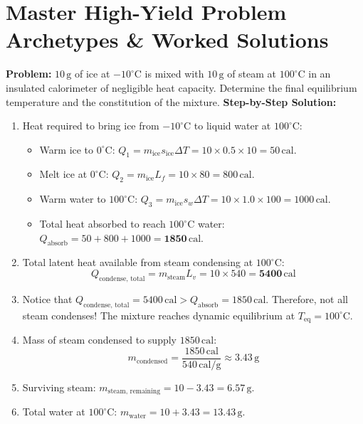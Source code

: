 \documentclass[10pt,a4paper]{article}
\begin{document}
\section{Master High-Yield Problem Archetypes \& Worked Solutions}

\begin{usecasebox}
\textbf{Problem:} $10\,\mathrm{g}$ of ice at $-10^\circ\mathrm{C}$ is mixed with $10\,\mathrm{g}$ of steam at $100^\circ\mathrm{C}$ in an insulated calorimeter of negligible heat capacity. Determine the final equilibrium temperature and the constitution of the mixture.
\textbf{Step-by-Step Solution:}
\begin{enumerate}
  \item Heat required to bring ice from $-10^\circ\mathrm{C}$ to liquid water at $100^\circ\mathrm{C}$:
  \begin{itemize}
    \item Warm ice to $0^\circ\mathrm{C}$: $Q_1 = m_{\text{ice}} s_{\text{ice}} \Delta T = 10 \times 0.5 \times 10 = 50\,\mathrm{cal}$.
    \item Melt ice at $0^\circ\mathrm{C}$: $Q_2 = m_{\text{ice}} L_f = 10 \times 80 = 800\,\mathrm{cal}$.
    \item Warm water to $100^\circ\mathrm{C}$: $Q_3 = m_{\text{ice}} s_w \Delta T = 10 \times 1.0 \times 100 = 1000\,\mathrm{cal}$.
    \item Total heat absorbed to reach $100^\circ\mathrm{C}$ water: $Q_{\text{absorb}} = 50 + 800 + 1000 = \mathbf{1850\,\mathrm{cal}}$.
  \end{itemize}
  \item Total latent heat available from steam condensing at $100^\circ\mathrm{C}$:
  \begin{equation}
    Q_{\text{condense, total}} = m_{\text{steam}} L_v = 10 \times 540 = \mathbf{5400\,\mathrm{cal}}
  \end{equation}
  \item Notice that $Q_{\text{condense, total}} = 5400\,\mathrm{cal} > Q_{\text{absorb}} = 1850\,\mathrm{cal}$.
  Therefore, not all steam condenses! The mixture reaches dynamic equilibrium at \textbf{$T_{\text{eq}} = 100^\circ\mathrm{C}$}.
  \item Mass of steam condensed to supply $1850\,\mathrm{cal}$:
  \begin{equation}
    m_{\text{condensed}} = \frac{1850\,\mathrm{cal}}{540\,\mathrm{cal/g}} \approx 3.43\,\mathrm{g}
  \end{equation}
  \item Surviving steam: $m_{\text{steam, remaining}} = 10 - 3.43 = \mathbf{6.57\,\mathrm{g}}$.
  \item Total water at $100^\circ\mathrm{C}$: $m_{\text{water}} = 10 + 3.43 = \mathbf{13.43\,\mathrm{g}}$.
\end{enumerate}
\end{usecasebox}
\end{document}
